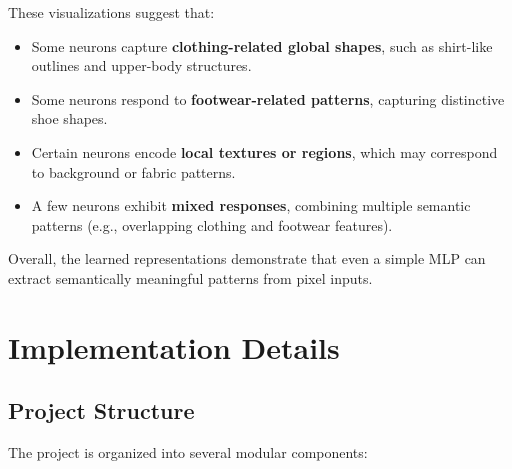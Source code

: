 \documentclass[11pt]{article}
\begin{document}
These visualizations suggest that:
\begin{itemize}
    \item Some neurons capture \textbf{clothing-related global shapes}, such as shirt-like outlines and upper-body structures.
    \item Some neurons respond to \textbf{footwear-related patterns}, capturing distinctive shoe shapes.
    \item Certain neurons encode \textbf{local textures or regions}, which may correspond to background or fabric patterns.
    \item A few neurons exhibit \textbf{mixed responses}, combining multiple semantic patterns (e.g., overlapping clothing and footwear features).
\end{itemize}

Overall, the learned representations demonstrate that even a simple MLP can extract semantically meaningful patterns from pixel inputs.

\section{Implementation Details}

\subsection{Project Structure}

The project is organized into several modular components:
\end{document}
